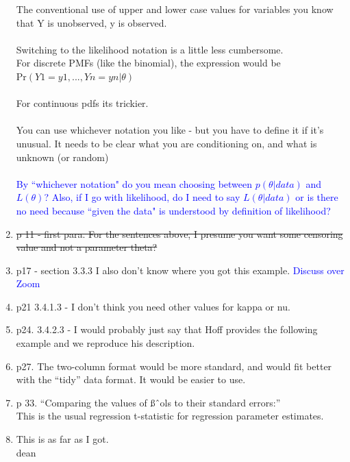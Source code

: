 \documentclass[12pt, a4paper]{article}
\begin{document}
\begin{enumerate}
    The conventional use of upper and lower case values for variables you know that Y is unobserved, y is observed.\\\\

    Switching to the likelihood notation is a little less cumbersome.  \\
    For discrete PMFs (like the binomial), the expression would be\\
    Pr$(Y1 = y1,...,Yn=yn | \theta)$\\\\

    For continuous pdfs its trickier.\\\\

    You can use whichever notation you like - but you have to define it if it’s unusual.  It needs to be clear what you are conditioning on, and what is unknown (or random)\\\\
    \textcolor{blue}{By ``whichever notation" do you mean choosing between $p(\theta|data)$ and $L(\theta)$?  Also, if I go with likelihood, do I need to say $L(\theta|data)$ or is there no need because ``given the data" is understood by definition of likelihood?}
  \item \sout{p 11 - first para.  For the sentences above, I presume you want some censoring value and not a parameter theta?}
  \item p17 - section 3.3.3  I also don't know where you got this example. \textcolor{blue}{Discuss over Zoom}
  \item p21 3.4.1.3 - I don't think you need other values for kappa or nu.
  \item p24. 3.4.2.3 - I would probably just say that Hoff provides the following example and we reproduce his description.
  \item p27. The two-column format would be more standard, and would fit better with the “tidy” data format.  It would be easier to use.
  \item p 33.  ``Comparing the values of ßˆols to their standard errors:”\\
    This is the usual regression t-statistic for regression parameter estimates.
  \item This is as far as I got.\\
    dean

\end{enumerate}
\end{document}
